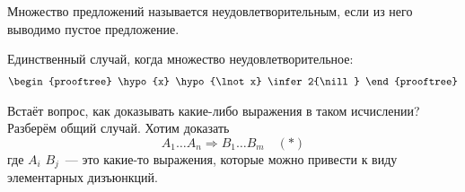 \documentclass[main]{subfiles}
\begin{document}
\begin{definition}
    Множество предложений называется неудовлетворительным, если из него выводимо пустое предложение.
\end{definition}
\begin{remark}
    Единственный случай, когда множество неудовлетворительное:
    \begin{gather*}
        \begin{prooftree}
            \hypo{x}
            \hypo{\lnot x}
            \infer2{\nill}
        \end{prooftree}
    \end{gather*}
\end{remark}
Встаёт вопрос, как доказывать какие-либо выражения в таком исчислении? Разберём общий случай. Хотим доказать \[A_1 \dots A_n \Rightarrow B_1 \dots B_m \quad (*)\]где $A_i$ $B_j$~--- это какие-то выражения, которые можно привести к виду элементарных дизъюнкций.
\end{document}
